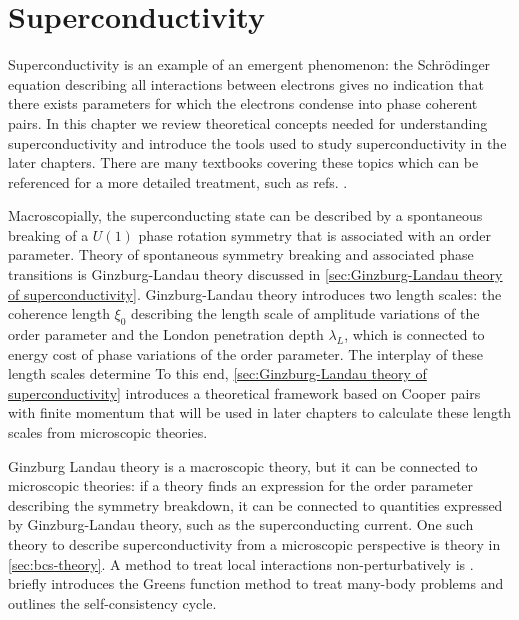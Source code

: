 \documentclass[../notes.tex]{subfiles}
\begin{document}
\chapter{Superconductivity}\label{ch:superconductivity}

Superconductivity is an example of an emergent phenomenon: the Schrödinger equation describing all interactions between electrons gives no indication that there exists parameters for which the electrons condense into phase coherent pairs.
In this chapter we review theoretical concepts needed for understanding superconductivity and introduce the tools used to study superconductivity in the later chapters.
There are many textbooks covering these topics which can be referenced for a more detailed treatment, such as refs. \cite{colemanIntroductionManyBodyPhysics2015, tinkhamIntroductionSuperconductivity1996, bruusManyBodyQuantumTheory2004, larkinTheoryFluctuationsSuperconductors2005, bennemannSuperconductivity2008}.

Macroscopially, the superconducting state can be described by a spontaneous breaking of a \(U(1)\) phase rotation symmetry that is associated with an order parameter.
Theory of spontaneous symmetry breaking and associated phase transitions is Ginzburg-Landau theory discussed in \cref{sec:Ginzburg-Landau theory of superconductivity}.
Ginzburg-Landau theory introduces two length scales: the coherence length \(\xi_0\) describing the length scale of amplitude variations of the order parameter and the London penetration depth \(\lambda_L\), which is connected to energy cost of phase variations of the order parameter.
The interplay of these length scales determine 
To this end, \cref{sec:Ginzburg-Landau theory of superconductivity}  introduces a theoretical framework based on Cooper pairs with finite momentum \cite{wittBypassingLatticeBCS2024} that will be used in later chapters to calculate these length scales from microscopic theories.

Ginzburg Landau theory is a macroscopic theory, but it can be connected to microscopic theories: if a theory finds an expression for the order parameter describing the symmetry breakdown, it can be connected to quantities expressed by Ginzburg-Landau theory, such as the superconducting current.
One such theory to describe superconductivity from a microscopic perspective is  theory in \cref{sec:bcs-theory}.
A method to treat local interactions non-perturbatively is .  briefly introduces the Greens function method to treat many-body problems and outlines the  self-consistency cycle.
\end{document}
